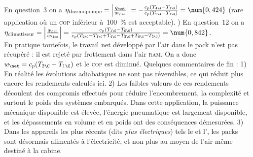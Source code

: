 \begin{description}
			En question~3 on a $\eta_\text{thermopompe}
			= \left|\frac{q_\out}{w_\inn}\right|
			= -\frac{c_p (T_{4\A} - T_{1\A})}{c_p (T_{2\A}-T_{1\A})}
			= \num{0,424}$ (rare application où un \textsc{cop} inférieur à~\SI{100}{\percent} est acceptable).
			) En question~12 on a $\eta_\text{climatiseur} = \left|\frac{q_\inn}{w_\inn}\right| = \frac{c_p(T_{1\C} - T_{6\C})}{c_p (T_{2\C} - T_{1\C} + T_{4\C} - T_{3\C} + T_{6\C} - T_{5\C})} = \num{0,842} $.\\
			En pratique toutefois, le travail net développé par l’air dans le pack n’est pas récupéré : il est rejeté par frottement dans l’air \textsc{ram}. On a donc $w_\net = c_p(T_{2\C} - T_{1\C})$ et le \textsc{cop} est diminué.
			\tab Quelques commentaires de fin : 1) En réalité les évolutions adiabatiques ne sont pas réversibles, ce qui réduit plus encore les rendements calculés ici. 2) Les faibles valeurs de ces rendements découlent des compromis effectués pour réduire l’encombrement, la complexité et surtout le poids des systèmes embarqués. Dans cette application, la puissance mécanique disponible est élevée, l’énergie pneumatique est largement disponible, et les dépassements en volume et en poids ont des conséquences démesurées. 3) Dans les appareils les plus récents (dits \textit{plus électriques}) tels le  et l’, les packs sont désormais alimentés à l’électricité, et non plus au moyen de l’air-même destiné à la cabine.
\end{description}
